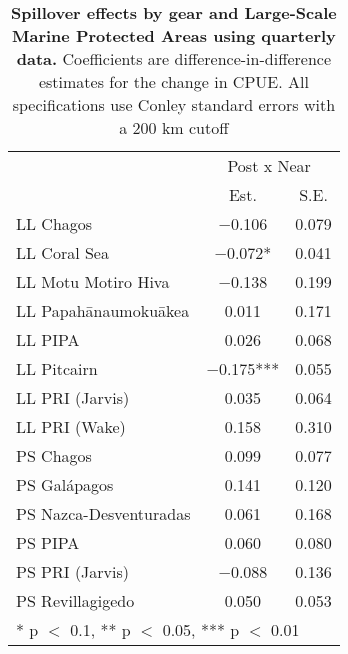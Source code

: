 \begin{table}

\caption{\label{tab:mpa_reg_quarterly}\textbf{Spillover effects by gear and Large-Scale Marine Protected Areas using quarterly data.} Coefficients are difference-in-difference estimates for the change in CPUE. All specifications use Conley standard errors with a 200 km cutoff}
\centering
\begin{tabular}[t]{lcc}
\toprule
\multicolumn{1}{c}{ } & \multicolumn{2}{c}{Post x Near} \\
\cmidrule(l{3pt}r{3pt}){2-3}
  & Est. & S.E.\\
\midrule
LL Chagos & \num{-0.106} & \num{0.079}\\
LL Coral Sea & \num{-0.072}* & \num{0.041}\\
LL Motu Motiro Hiva & \num{-0.138} & \num{0.199}\\
LL Papahānaumokuākea & \num{0.011} & \num{0.171}\\
LL PIPA & \num{0.026} & \num{0.068}\\
LL Pitcairn & \num{-0.175}*** & \num{0.055}\\
LL PRI (Jarvis) & \num{0.035} & \num{0.064}\\
LL PRI (Wake) & \num{0.158} & \num{0.310}\\
PS Chagos & \num{0.099} & \num{0.077}\\
PS Galápagos & \num{0.141} & \num{0.120}\\
PS Nazca-Desventuradas & \num{0.061} & \num{0.168}\\
PS PIPA & \num{0.060} & \num{0.080}\\
PS PRI (Jarvis) & \num{-0.088} & \num{0.136}\\
PS Revillagigedo & \num{0.050} & \num{0.053}\\
\bottomrule
\multicolumn{3}{l}{\rule{0pt}{1em}* p $<$ 0.1, ** p $<$ 0.05, *** p $<$ 0.01}\\
\end{tabular}
\end{table}
